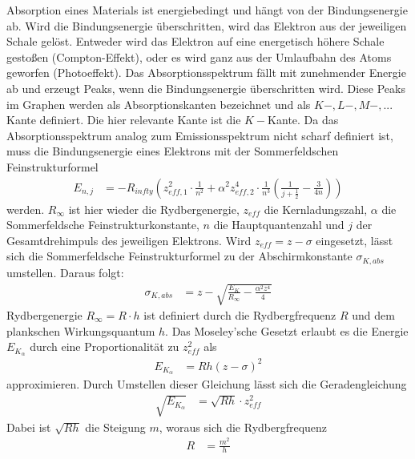\justifying Absorption eines Materials ist energiebedingt und hängt von der Bindungsenergie ab. Wird die Bindungsenergie 
überschritten, wird das Elektron aus der jeweiligen Schale gelöst. Entweder wird das Elektron auf eine energetisch höhere Schale gestoßen 
(Compton-Effekt), oder es wird ganz aus der Umlaufbahn des Atoms geworfen (Photoeffekt). Das Absorptionsspektrum fällt mit zunehmender Energie ab und erzeugt
Peaks, wenn die Bindungsenergie überschritten wird. Diese Peaks im Graphen werden als Absorptionskanten bezeichnet und als $K-, L-, M-,...$ Kante definiert. 
Die hier relevante Kante ist die $K-$Kante. Da das Absorptionsspektrum analog zum Emissionsspektrum nicht scharf definiert ist, muss die Bindungsenergie
eines Elektrons mit der Sommerfeldschen Feinstrukturformel \cite{V602} 
\begin{align}
    E_{n,j} &= -R_{infty} \left( z_{eff,1}^2 \cdot \frac{1}{n^2} + \alpha^2 z_{eff,2}^4 \cdot \frac{1}{n^3} \left( \frac{1}{j+\frac{1}{2}} - \frac{3}{4n} \right) \right) \label{eq:3}
\end{align}
\justifying werden. $R_{\infty}$ ist hier wieder die Rydbergenergie, $z_{eff}$ die Kernladungszahl, $\alpha$ die 
Sommerfeldsche Feinstrukturkonstante, $n$ die Hauptquantenzahl und $j$ der Gesamtdrehimpuls des jeweiligen Elektrons. Wird $z_{eff}=z-\sigma$
eingesetzt, lässt sich die Sommerfeldsche Feinstrukturformel zu der Abschirmkonstante $\sigma_{K,abs}$ umstellen. Daraus folgt: \cite{V602}
\begin{align}
    \sigma_{K,abs} &= z - \sqrt{\frac{E_K}{R_{\infty}} - \frac{\alpha^2 z^4}{4}} \label{eq:4}
\end{align}
\justifying Rydbergenergie $R_{\infty}= R\cdot h$ ist definiert durch die Rydbergfrequenz $R$ und dem plankschen Wirkungsquantum $h$.
Das Moseley'sche Gesetzt erlaubt es die Energie $E_{K_{\alpha}}$ durch eine Proportionalität zu $z_{eff}^2$ als 
\begin{align}
    E_{K_{\alpha}} &= Rh \left( z-\sigma \right)^2 \label{eq:Mosel}
\end{align}
\justifying approximieren. Durch Umstellen dieser Gleichung lässt sich die Geradengleichung
\begin{align}
    \sqrt{E_{K_{\alpha}}} &= \sqrt{Rh}\cdot z_{eff}^2 \label{eq:RyGl}
\end{align}
\justifying Dabei ist $\sqrt{Rh}$ die Steigung $m$, woraus sich die Rydbergfrequenz
\begin{align}
 R &= \frac{m^2}{h} \label{eq:Ryf}
 \end{align}
